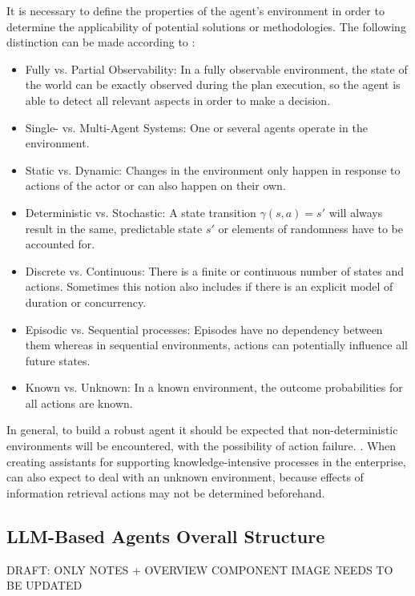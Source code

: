 \documentclass{article}
\begin{document}
It is necessary to define the properties of the agent's environment in order to determine the applicability of potential solutions or methodologies. The following distinction can be made according to \cite{russell_artificial_2010}: 
\begin{itemize}
	\item Fully vs. Partial Observability: In a fully observable environment, the state of the world can be exactly observed during the plan execution, so the agent is able to detect all relevant aspects in order to make a decision.
	\item Single- vs. Multi-Agent Systems:  One or several agents operate in the environment.
	\item Static vs. Dynamic: Changes in the environment only happen in response to actions of the actor or can also happen on their own. 
	\item Deterministic vs. Stochastic: A state transition $\gamma(s,a)=s'$ will always result in the same, predictable state $s'$ or elements of randomness have to be accounted for.
	\item Discrete vs. Continuous: There is a finite or continuous number of states and actions. Sometimes this notion also includes if there is an explicit model of duration or concurrency.
	\item Episodic vs. Sequential processes: Episodes have no dependency between them whereas in sequential environments, actions can potentially influence all future states.
	\item Known vs. Unknown: In a known environment, the outcome probabilities for all actions are known.
\end{itemize}
In general, to build a robust agent it should be expected that non-deterministic environments will be encountered, with the possibility of action failure. \cite{goos_intelligent_2002}. 
When creating assistants for supporting knowledge-intensive processes in the enterprise, can also expect to deal with an unknown environment, because effects of information retrieval actions may not be determined beforehand.

\subsection{LLM-Based Agents Overall Structure}
DRAFT: ONLY NOTES + OVERVIEW COMPONENT IMAGE NEEDS TO BE UPDATED
\end{document}
